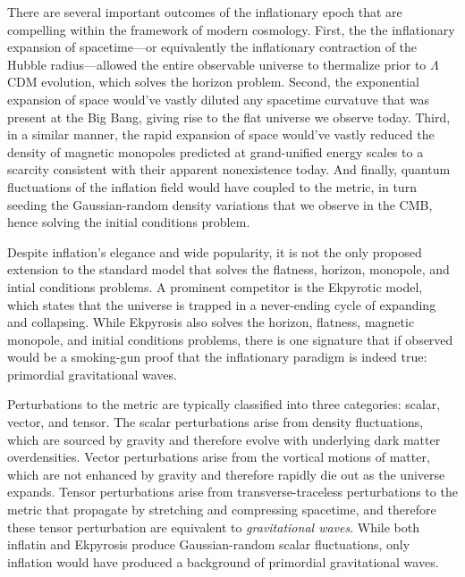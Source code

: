 There are several important outcomes of the inflationary epoch that are compelling within the framework of modern cosmology. First, the the inflationary expansion of spacetime---or equivalently the inflationary contraction of the Hubble radius---allowed the entire observable universe to thermalize prior to $\Lambda$CDM evolution, which solves the horizon problem. Second, the exponential expansion of space would've vastly diluted any spacetime curvatuve that was present at the Big Bang, giving rise to the flat universe we observe today. Third, in a similar manner, the rapid expansion of space would've vastly reduced the density of magnetic monopoles predicted at grand-unified energy scales to a scarcity consistent with their apparent nonexistence today. And finally, quantum fluctuations of the inflation field would have coupled to the metric, in turn seeding the Gaussian-random density variations that we observe in the CMB, hence solving the initial conditions problem.

Despite inflation's elegance and wide popularity, it is not the only proposed extension to the standard model that solves the flatness, horizon, monopole, and intial conditions problems. A prominent competitor is the Ekpyrotic model, which states that the universe is trapped in a never-ending cycle of expanding and collapsing. While Ekpyrosis also solves the horizon, flatness, magnetic monopole, and initial conditions problems, there is one signature that if observed would be a smoking-gun proof that the inflationary paradigm is indeed true: primordial gravitational waves.

Perturbations to the metric are typically classified into three categories: scalar, vector, and tensor. The scalar perturbations arise from density fluctuations, which are sourced by gravity and therefore evolve with underlying dark matter overdensities. Vector perturbations arise from the vortical motions of matter, which are not enhanced by gravity and therefore rapidly die out as the universe expands. Tensor perturbations arise from transverse-traceless perturbations to the metric that propagate by stretching and compressing spacetime, and therefore these tensor perturbation are equivalent to \textit{gravitational waves}. While both inflatin and Ekpyrosis produce Gaussian-random scalar fluctuations, only inflation would have produced a background of primordial gravitational waves.

